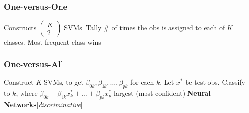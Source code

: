 \documentclass[9pt]{article}
\theoremstyle{definition}
\begin{document}
\begin{multicols}{2}
\subsubsection{One-versus-One}
Constructs $\begin{pmatrix}K\\2\end{pmatrix}$ SVMs. Tally \# of times the obs is assigned to each of $K$ classes. Most frequent class wins
\subsubsection{One-versus-All}
Construct $K$ SVMs, to get $\beta_{0k},\beta_{1k},\dots,\beta_{pk}$ for each $k$. Let $x^*$ be test obs. Classify to $k$, where $\beta_{0k}+\beta_{1k}x^*_k+\dots+\beta_{pk}x^*_p$ largest (most confident)
\textbf{Neural Networks}[\textit{discriminative}]
\end{multicols}
\end{document}
